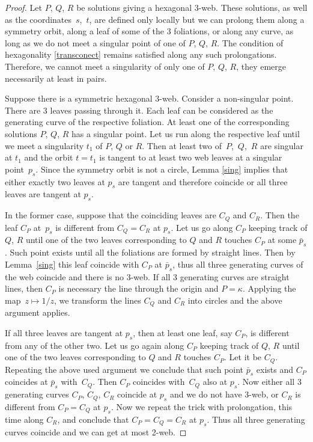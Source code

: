 \documentclass[pdftex]{sigma}
\numberwithin{equation}{section}
\begin{document}
\begin{proof}
Let $P$, $Q$, $R$ be solutions giving a hexagonal 3-web. These solutions, as well as the coordinates~$s$,~$t$, are defined only locally but we can prolong them along a symmetry orbit, along a leaf of some of the 3 foliations, or along any curve, as long as we do not meet a singular point of one of $P$, $Q$, $R$.
The condition of hexagonality \eqref{transconect} remains satisfied along any such prolongations. Therefore, we cannot meet a singularity of only one of $P$, $Q$, $R$, they emerge necessarily at least in pairs.

Suppose there is a symmetric hexagonal 3-web. Consider a non-singular point. There are 3 leaves passing through it. Each leaf can be considered as the generating curve of the respective foliation. At least one of the corresponding solutions $P$, $Q$, $R$ has a singular point. Let us run along the respective leaf until we meet a singularity $t_1$ of $P$, $Q$ or $R$. Then at least two of~$P$,~$Q$,~$R$ are singular at $t_1$ and the orbit $t=t_1$ is tangent to at least two web leaves at a singular point~$p_s$. Since the symmetry orbit is not a circle, Lemma \ref{sing} implies that either exactly two leaves at $p_s$ are tangent and therefore coincide or all three leaves are tangent at $p_s$.

In the former case, suppose that the coinciding leaves are $C_Q$ and $C_R$. Then the leaf $C_P$ at~$p_s$ is different from $C_Q=C_R$ at $p_s$. Let us go along $C_P$ keeping track of $Q$, $R$ until one of the two leaves corresponding to $Q$ and $R$ touches $C_P$ at some $\bar{p}_s$. Such point exists until all the foliations are formed by straight lines. Then by Lemma~\ref{sing} this leaf coincide with $C_P$ at $\bar{p}_s$, thus all three generating curves of the web coincide and there is no 3-web. If all 3 generating curves are straight lines, then $C_P$ is necessary the line through the origin and $P=\kappa$. Applying the map~${z\mapsto 1/z}$, we transform the lines $C_Q$ and $C_R$ into circles and the above argument applies.

If all three leaves are tangent at $p_s$, then at least one leaf, say $C_P$, is different from any of the other two. Let us go again along $C_P$ keeping track of $Q$, $R$ until one of the two leaves corresponding to $Q$ and $R$ touches $C_P$. Let it be $C_Q$. Repeating the above used argument we conclude that such point $\bar{p}_s$ exists and $C_P$ coincides at $\bar{p}_s$ with~$C_Q$. Then $C_P$ coincides with~$C_Q$ also at $p_s$. Now either all 3 generating curves $C_P$, $C_Q$, $C_R$ coincide at $p_s$ and we do not have 3-web, or $C_R$ is different from $C_P=C_Q$ at $p_s$. Now we repeat the trick with prolongation, this time along $C_R$, and conclude that $C_P=C_Q=C_R$ at $p_s$. Thus all three generating curves coincide and we can get at most 2-web.
\end{proof}
\end{document}
